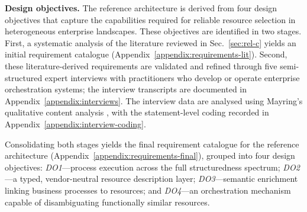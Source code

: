 \documentclass[10pt,twocolumn]{article}
\begin{document}
\textbf{Design objectives.} The reference architecture is derived from four design objectives that capture the capabilities required for reliable resource selection in heterogeneous enterprise landscapes. These objectives are identified in two stages. First, a systematic analysis of the literature reviewed in Sec.~\ref{sec:rel-c} yields an initial requirement catalogue (Appendix~\ref{appendix:requirements-lit}). Second, these literature-derived requirements are validated and refined through five semi-structured expert interviews with practitioners who develop or operate enterprise orchestration systems; the interview transcripts are documented in Appendix~\ref{appendix:interviews}. The interview data are analysed using Mayring's qualitative content analysis \citep{mayring_qualitative_2014}, with the statement-level coding recorded in Appendix~\ref{appendix:interview-coding}. 

Consolidating both stages yields the final requirement catalogue for the reference architecture (Appendix~\ref{appendix:requirements-final}), grouped into four design objectives: \textit{DO1}—process execution across the full structuredness spectrum; \textit{DO2}—a typed, vendor-neutral resource description layer; \textit{DO3}—semantic enrichment linking business processes to resources; and \textit{DO4}—an orchestration mechanism capable of disambiguating functionally similar resources.
\end{document}
